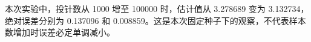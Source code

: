 本次实验中，投针数从 1000 增至 100000 时，估计值从 3.278689 变为 3.132734，绝对误差分别为 0.137096 和 0.008859。这是本次固定种子下的观察，不代表样本数增加时误差必定单调减小。
